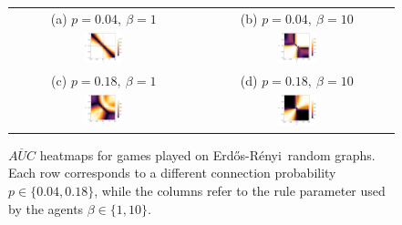 \documentclass[letterpaper]{article}
\newcommand{\ER}{Erd\H{o}s-R\'{e}nyi~}
\begin{document}
\begin{figure}[!t]
    \begin{tabular}{cc}
        {\footnotesize (a) $p=0.04,~\beta=1$} & {\footnotesize (b) $p=0.04,~\beta=10$} \\
        \includegraphics[width=0.21\textwidth]{"heatmap/ErdosRenyi_0.04_01"} &
        \includegraphics[width=0.21\textwidth]{"heatmap/ErdosRenyi_0.04_10"} \\
        {\footnotesize (c) $p=0.18,~\beta=1$} & {\footnotesize (d) $p=0.18,~\beta=10$} \\
        \includegraphics[width=0.21\textwidth]{"heatmap/ErdosRenyi_0.18_01"} &
        \includegraphics[width=0.21\textwidth]{"heatmap/ErdosRenyi_0.18_10"}
    \end{tabular}
    \caption{\label{fig:er}
    $\overline{AUC}$ heatmaps for games played on \ER random graphs. Each row corresponds to a different connection probability $p\in\{0.04,0.18\}$, while the columns refer to the rule parameter used by the agents $\beta\in\{1,10\}$.\\}
\end{figure}
\end{document}

